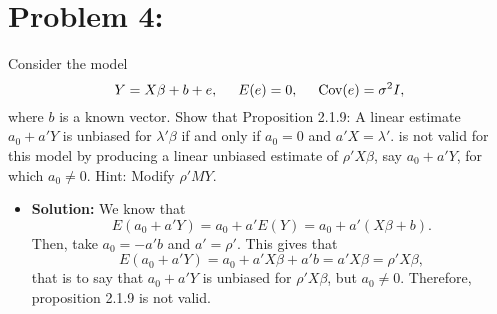 \documentclass[11pt]{article}
\begin{document}
\section*{Problem 4:}
Consider the model
\[
Y = X\beta + b + e, \hspace{5mm} E(e) = 0, \hspace{5mm} \text{Cov}(e) = \sigma^2I,
\]
where $b$ is a known vector.  Show that Proposition 2.1.9:  A linear estimate $a_0 + a'Y$ is unbiased for $\lambda'\beta$ if and only if $a_0 = 0$ and $a'X = \lambda'$. is not valid for this model by producing a linear unbiased estimate of $\rho'X\beta$, say $a_0 + a'Y$, for which $a_0 \not= 0$.  Hint:  Modify $\rho'MY$.
\begin{itemize}
\item[] {\bf Solution:}  We know that
\[
E(a_0+a'Y) = a_0 + a'E(Y) = a_0 + a'(X\beta + b).
\]
Then, take $a_0 = -a'b$ and $a' = \rho'$.  This gives that
\[
E(a_0+a'Y) = a_0 + a'X\beta + a'b = a'X\beta = \rho'X\beta,
\]
that is to say that $a_0+a'Y$ is unbiased for $\rho'X\beta$, but $a_0 \not= 0$.  Therefore, proposition 2.1.9 is not valid.
\end{itemize}

\newpage
\end{document}
